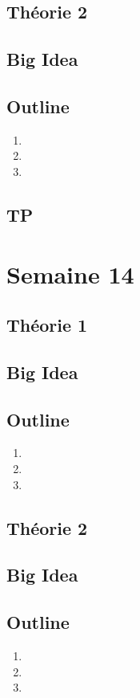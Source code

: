 \documentclass{article}
\begin{document}
\subsection{Théorie 2}
\subsection*{Big Idea}
\subsection*{Outline}
\begin{enumerate}
    \item
    \item
    \item
\end{enumerate}
\subsection{TP}

\pagebreak
\section{Semaine 14}
\subsection{Théorie 1}
\subsection*{Big Idea}
\subsection*{Outline}
\begin{enumerate}
    \item
    \item
    \item
\end{enumerate}
\subsection{Théorie 2}
\subsection*{Big Idea}
\subsection*{Outline}
\begin{enumerate}
    \item
    \item
    \item
\end{enumerate}
\end{document}
